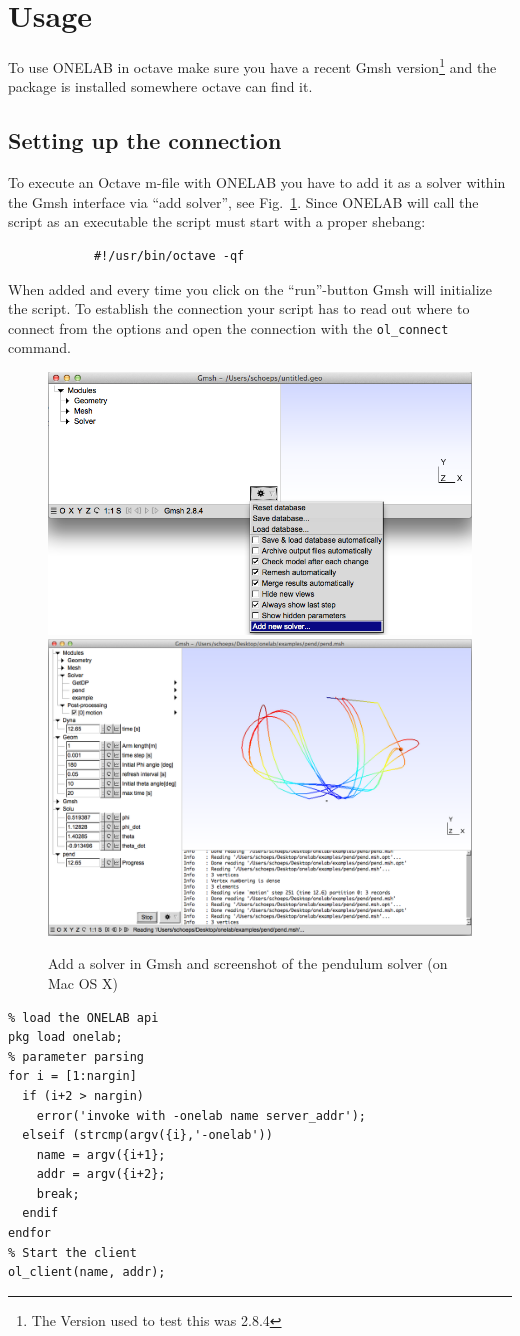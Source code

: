 \documentclass[article,english,colorback,accentcolor=tud9b,11pt]{tudreport}
\begin{document}
		\section{Usage}
		To use ONELAB in octave make sure you have a recent Gmsh version\footnote{The Version used to test this was 2.8.4} and the package is installed somewhere octave can find it.
		\subsection{Setting up the connection}
		To execute an Octave m-file with ONELAB you have to add it as a solver within the Gmsh interface via ``add solver'', see Fig.~\ref{fig:gmsh}. Since ONELAB will call the script as an executable the script must start with a proper shebang:
		\begin{lstlisting} 
			#!/usr/bin/octave -qf
		\end{lstlisting}
		When added and every time you click on the ``run''-button Gmsh will initialize the script. To establish the connection your script has to read out where to connect from the options and open the connection with the \texttt{ol\_connect} command.
		\begin{figure}[b]
			\centering
			\includegraphics[width=.4\textwidth]{gmsh.png}
			\quad
			\includegraphics[width=.4\textwidth]{pend.png}        
			\caption{Add a solver in Gmsh and screenshot of the pendulum solver (on Mac OS X)}
			\label{fig:gmsh}
		\end{figure}
		\begin{lstlisting} 
% load the ONELAB api
pkg load onelab;
% parameter parsing
for i = [1:nargin]
  if (i+2 > nargin)
    error('invoke with -onelab name server_addr');
  elseif (strcmp(argv({i},'-onelab'))
    name = argv({i+1};
    addr = argv({i+2};
    break;
  endif
endfor
% Start the client
ol_client(name, addr);
		\end{lstlisting}
\end{document}

